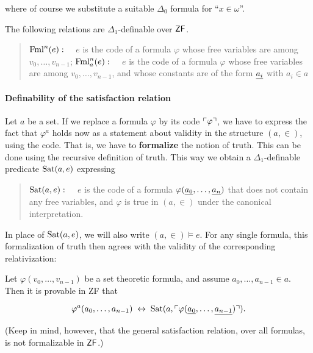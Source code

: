 where of course we substitute a suitable $\Delta_0$ formula for ``$x \in \omega$''.

\begin{proposition}\label{prop-defble-formula}The following relations are $\Delta_1$-definable over $\mathsf{ZF}$.

\begin{quote}
$\operatorname{Fml}^n(e): \quad$ $e$ is the code of a formula $\varphi$ whose free variables are among $v_0, \dots, v_{n -1}$;\newline
$\operatorname{Fml}^n_a(e): \quad$ $e$ is the code of a formula $\varphi$ whose free variables are among $v_0, \dots, v_{n -1}$, and whose constants are of the form $\underline{a_i}$ with $a_i \in a$
\end{quote}

\end{proposition}\paragraph{Definability of the satisfaction relation}

Let $a$ be a set. If we replace a formula $\varphi$ by its code $\ulcorner \varphi \urcorner$, we have to express the fact that $\varphi^a$ holds now as a statement about validity in the structure $(a,\in)$, using the code. That is, we have to \textbf{formalize} the notion of truth. This can be done using the recursive definition of truth.
This way we obtain a $\Delta_1$-definable predicate $\operatorname{Sat}(a,e)$ expressing

\begin{quote}
$\operatorname{Sat}(a,e): \quad$ $e$ is the code of a formula $\varphi(\underline{a_0}, \dots, \underline{a_n})$ that does not contain any free variables, and $\varphi$ is true in $(a,\in)$ under the canonical interpretation.
\end{quote}

In place of  $\operatorname{Sat}(a,e)$, we will also write $(a,\in) \models e$. For any single formula, this formalization of truth then agrees with the validity of the corresponding relativization:

\begin{theorem}\label{thm-sat-predicate}Let $\varphi(v_0, \dots, v_{n -1})$ be a set theoretic formula, and assume $a_0, \dots, a_{n -1} \in a$. Then it is provable in ZF that

\begin{equation}
\varphi^a(a_0, \dots, a_{n-1}) \; \leftrightarrow \; \operatorname{Sat}(a,\ulcorner \varphi(\underline{a_0}, \dots, \underline{a_{n-1}}) \urcorner).
\end{equation}

\end{theorem}(Keep in mind, however, that the general satisfaction relation, over all formulas, is not formalizable in $\mathsf{ZF}$.)

